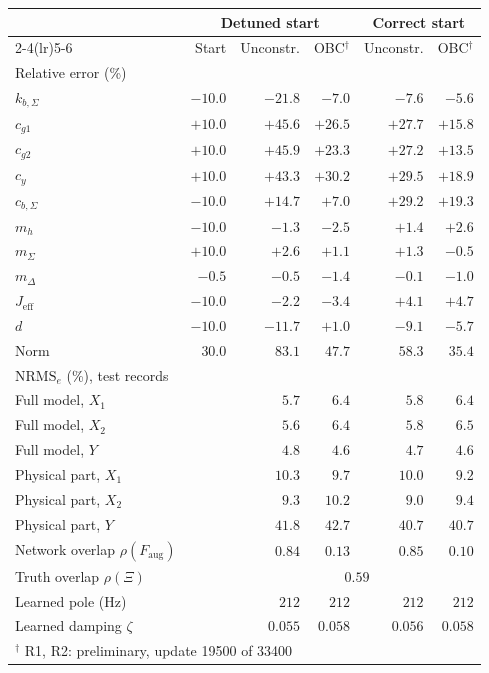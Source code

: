 \setlength{\tabcolsep}{3pt}
\begin{tabular}{l r r r r r}
\toprule
 & \multicolumn{3}{c}{Detuned start} & \multicolumn{2}{c}{Correct start}\\
\cmidrule(lr){2-4}\cmidrule(lr){5-6}
 & Start & Unconstr. & OBC$^\dagger$ & Unconstr. & OBC$^\dagger$\\
\midrule
\multicolumn{6}{l}{Relative error (\%)}\\
$k_{b,\Sigma}$ & $-10.0$ & $-21.8$ & $-7.0$ & $-7.6$ & $-5.6$\\
$c_{g1}$ & $+10.0$ & $+45.6$ & $+26.5$ & $+27.7$ & $+15.8$\\
$c_{g2}$ & $+10.0$ & $+45.9$ & $+23.3$ & $+27.2$ & $+13.5$\\
$c_y$ & $+10.0$ & $+43.3$ & $+30.2$ & $+29.5$ & $+18.9$\\
$c_{b,\Sigma}$ & $-10.0$ & $+14.7$ & $+7.0$ & $+29.2$ & $+19.3$\\
$m_h$ & $-10.0$ & $-1.3$ & $-2.5$ & $+1.4$ & $+2.6$\\
$m_\Sigma$ & $+10.0$ & $+2.6$ & $+1.1$ & $+1.3$ & $-0.5$\\
$m_\Delta$ & $-0.5$ & $-0.5$ & $-1.4$ & $-0.1$ & $-1.0$\\
$J_{\mathrm{eff}}$ & $-10.0$ & $-2.2$ & $-3.4$ & $+4.1$ & $+4.7$\\
$d$ & $-10.0$ & $-11.7$ & $+1.0$ & $-9.1$ & $-5.7$\\
Norm & $30.0$ & $83.1$ & $47.7$ & $58.3$ & $35.4$\\
\midrule
\multicolumn{6}{l}{$\mathrm{NRMS}_e$ (\%), test records}\\
Full model, $X_1$ &  & $5.7$ & $6.4$ & $5.8$ & $6.4$\\
Full model, $X_2$ &  & $5.6$ & $6.4$ & $5.8$ & $6.5$\\
Full model, $Y$ &  & $4.8$ & $4.6$ & $4.7$ & $4.6$\\
Physical part, $X_1$ &  & $10.3$ & $9.7$ & $10.0$ & $9.2$\\
Physical part, $X_2$ &  & $9.3$ & $10.2$ & $9.0$ & $9.4$\\
Physical part, $Y$ &  & $41.8$ & $42.7$ & $40.7$ & $40.7$\\
\midrule
Network overlap $\rho(F_{\mathrm{aug}})$ &  & $0.84$ & $0.13$ & $0.85$ & $0.10$\\
Truth overlap $\rho(\Xi)$ & & \multicolumn{4}{c}{$0.59$}\\
Learned pole (Hz) &  & $212$ & $212$ & $212$ & $212$\\
Learned damping $\zeta$ &  & $0.055$ & $0.058$ & $0.056$ & $0.058$\\
\bottomrule
\multicolumn{6}{l}{\footnotesize $^\dagger$ R1, R2: preliminary, update 19500 of 33400}\\
\end{tabular}
